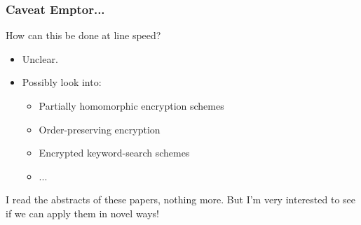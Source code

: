 \documentclass[handout]{beamer}
\begin{document}
\begin{frame}
	\frametitle{Caveat Emptor...}
	How can this be done at line speed?
	\begin{itemize}
		\item Unclear. 
		\item Possibly look into:
		\begin{itemize}
			\item Partially homomorphic encryption schemes
			\item Order-preserving encryption
			\item Encrypted keyword-search schemes
			\item ...
		\end{itemize}
	\end{itemize}
	\medskip
	\pause
	I read the abstracts of these papers, nothing more. But I'm very interested to see if we can apply them in novel ways!
\end{frame}


\end{document}
